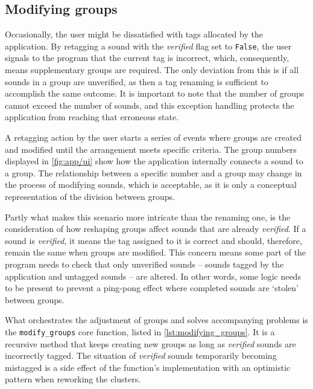 \subsection{Modifying groups}\label{sub:modifying_groups}
Occasionally, the user might be dissatisfied with tags allocated by the application. By retagging a sound with the \emph{verified} flag set to \texttt{False}, the user signals to the program that the current tag is incorrect, which, consequently, means supplementary groups are required. The only deviation from this is if all sounds in a group are unverified, as then a tag renaming is sufficient to accomplish the same outcome. It is important to note that the number of groups cannot exceed the number of sounds, and this exception handling protects the application from reaching that erroneous state.
\begin{mdframed}[style=code]
    
\end{mdframed}

A retagging action by the user starts a series of events where groups are created and modified until the arrangement meets specific criteria. The group numbers displayed in \cref{fig:app/ui} show how the application internally connects a sound to a group. The relationship between a specific number and a group may change in the process of modifying sounds, which is acceptable, as it is only a conceptual representation of the division between groups.

Partly what makes this scenario more intricate than the renaming one, is the consideration of how reshaping groups affect sounds that are already \emph{verified}. If a sound is \emph{verified}, it means the tag assigned to it is correct and should, therefore, remain the same when groups are modified. This concern means some part of the program needs to check that only unverified sounds – sounds tagged by the application and untagged sounds – are altered. In other words, some logic needs to be present to prevent a ping-pong effect where completed sounds are `stolen' between groups.

What orchestrates the adjustment of groups and solves accompanying problems is the \texttt{modify\_groups} core function, listed in \cref{lst:modifying_groups}. It is a recursive method that keeps creating new groups as long as \emph{verified} sounds are incorrectly tagged. The situation of \emph{verified} sounds temporarily becoming mistagged is a side effect of the function's implementation with an optimistic pattern when reworking the clusters.
\begin{mdframed}[style=code]
    
\end{mdframed}


